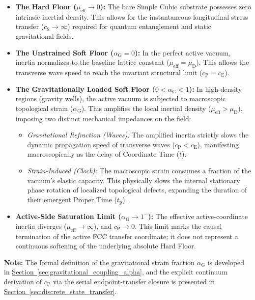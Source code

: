 \begin{itemize}
    \item \textbf{The Hard Floor ($\mu_{\mathrm{eff}} \to 0$):} The bare Simple Cubic substrate possesses zero intrinsic inertial density. This allows for the instantaneous longitudinal stress transfer ($c_{\mathrm{S}} \to \infty$) required for quantum entanglement and static gravitational fields.
    
    \item \textbf{The Unstrained Soft Floor ($\alpha_{\mathrm{G}} = 0$):} In the perfect active vacuum, inertia normalizes to the baseline lattice constant ($\mu_{\mathrm{eff}} = \mu_{\mathrm{D}}$). This allows the transverse wave speed to reach the invariant structural limit ($c_{\mathrm{P}} = c_{\mathrm{E}}$).
    
    \item \textbf{The Gravitationally Loaded Soft Floor ($0 < \alpha_{\mathrm{G}} < 1$):} In high-density regions (gravity wells), the active vacuum is subjected to macroscopic topological strain ($\alpha_{\mathrm{G}}$). This amplifies the local inertial density ($\mu_{\mathrm{eff}} > \mu_{\mathrm{D}}$), imposing two distinct mechanical impedances on the field:
    \begin{itemize}
        \item \textit{Gravitational Refraction (Waves):} The amplified inertia strictly slows the dynamic propagation speed of transverse waves ($c_{\mathrm{P}} < c_{\mathrm{E}}$), manifesting macroscopically as the delay of Coordinate Time ($t$).
        \item \textit{Strain-Induced (Clock):} The macroscopic strain consumes a fraction of the vacuum's elastic capacity. This physically slows the internal stationary phase rotation of localized topological defects, expanding the duration of their emergent Proper Time ($t_{\mathrm{p}}$).
    \end{itemize}

    \item \textbf{Active-Side Saturation Limit ($\alpha_{\mathrm{G}} \rightarrow 1^{-}$):} The effective active-coordinate inertia diverges ($\mu_{\mathrm{eff}} \to \infty$), and $c_{\mathrm{P}} \rightarrow 0$. This limit marks the causal termination of the active FCC transfer coordinate; it does not represent a continuous softening of the underlying absolute Hard Floor.
\end{itemize}

\vspace{0.5em}
\noindent\textbf{Note:} The formal definition of the gravitational strain fraction $\alpha_{\mathrm{G}}$ is developed in \hyperref[sec:gravitational_coupling_alpha]{Section~\ref*{sec:gravitational_coupling_alpha}}, and the explicit continuum derivation of $c_{\mathrm{P}}$ via the serial endpoint-transfer closure is presented in \hyperref[sec:discrete_state_transfer]{Section~\ref*{sec:discrete_state_transfer}}.

